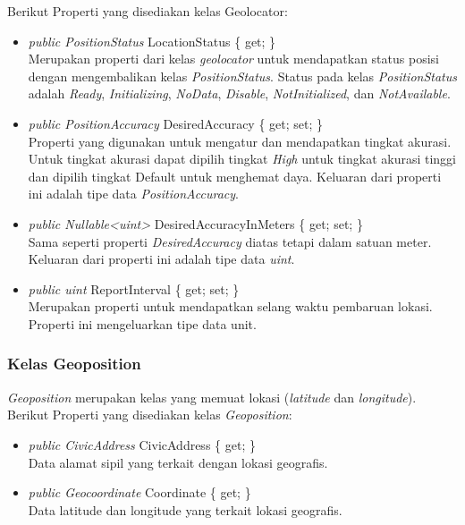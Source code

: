Berikut Properti yang disediakan kelas Geolocator:
\begin{itemize}
	\item \textit{public PositionStatus} LocationStatus \{ get; \} \\
		Merupakan properti dari kelas \textit{geolocator} untuk mendapatkan status posisi dengan mengembalikan kelas \textit{PositionStatus}. Status pada kelas \textit{PositionStatus} adalah \textit{Ready}, \textit{Initializing}, \textit{NoData}, \textit{Disable}, \textit{NotInitialized}, dan \textit{NotAvailable}.
	\item \textit{public PositionAccuracy} DesiredAccuracy \{ get; set; \} \\
		Properti yang digunakan untuk mengatur dan mendapatkan tingkat akurasi. Untuk tingkat akurasi dapat dipilih tingkat \textit{High} untuk tingkat akurasi tinggi dan dipilih tingkat {Default} untuk menghemat daya. Keluaran dari properti ini adalah tipe data \textit{PositionAccuracy}.
	\item \textit{public Nullable<uint>} DesiredAccuracyInMeters \{ get; set; \}\\
		Sama seperti properti \textit{DesiredAccuracy} diatas tetapi dalam satuan meter. Keluaran dari properti ini adalah tipe data \textit{uint}.
	\item \textit{public uint} ReportInterval \{ get; set; \} \\
		Merupakan properti untuk mendapatkan selang waktu pembaruan lokasi. Properti ini mengeluarkan tipe data unit.
\end{itemize}

\subsubsection{Kelas Geoposition}
\label{subsubsec:Kelas Geoposition}
\hspace{0.5cm} \textit{Geoposition} merupakan kelas yang memuat lokasi (\textit{latitude} dan \textit{longitude}).
Berikut Properti yang disediakan kelas \textit{Geoposition}:
\begin{itemize}
	\item \textit{public CivicAddress} CivicAddress \{ get; \} \\
		Data alamat sipil yang terkait dengan lokasi geografis.
	\item \textit{public Geocoordinate} Coordinate \{ get; \} \\
		Data latitude dan longitude yang terkait lokasi geografis.
\end{itemize}

